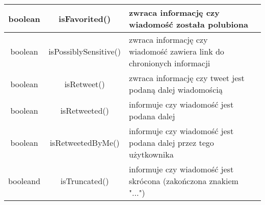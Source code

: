 \begin{table}
\centering
\label{tab:table1}
\begin{tabularx}{\linewidth}{|c|c|X|c|}\toprule 
    boolean & isFavorited() & zwraca informację czy wiadomość została polubiona \\ \midrule
    boolean & isPossiblySensitive() & zwraca informację czy wiadomość zawiera link do chronionych informacji \\ \midrule
    boolean & isRetweet() & zwraca informację czy tweet jest podaną dalej wiadomością \\ \midrule
    boolean & isRetweeted() & informuje czy wiadomość jest podana dalej \\ \midrule
    boolean & isRetweetedByMe() & informuje czy wiadomość jest podana dalej przez tego użytkownika \\ \midrule
    booleand & isTruncated() & informuje czy wiadomość jest skrócona (zakończona znakiem "...") \\ \bottomrule
\end{tabularx}
\end{table}
